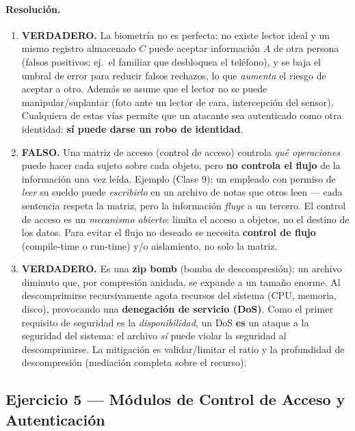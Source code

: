 \paragraph{Resolución.}
\begin{enumerate}[label=(\arabic*),leftmargin=2.2em,itemsep=4pt]
  \item \textbf{VERDADERO.} La biometría no es perfecta: no existe lector ideal y un mismo
        registro almacenado $C$ puede aceptar información $A$ de otra persona (falsos positivos;
        ej.\ el familiar que desbloquea el teléfono), y se baja el umbral de error para reducir
        falsos rechazos, lo que \emph{aumenta} el riesgo de aceptar a otro. Además se asume que el
        lector no se puede manipular/suplantar (foto ante un lector de cara, intercepción del
        sensor). Cualquiera de estas vías permite que un atacante sea autenticado como otra
        identidad: \textbf{sí puede darse un robo de identidad}.
  \item \textbf{FALSO.} Una matriz de acceso (control de acceso) controla \emph{qué operaciones}
        puede hacer cada sujeto sobre cada objeto, pero \textbf{no controla el flujo} de la
        información una vez leída. Ejemplo (Clase 9): un empleado con permiso de \emph{leer} su
        sueldo puede \emph{escribirlo} en un archivo de notas que otros leen --- cada sentencia
        respeta la matriz, pero la información \emph{fluye} a un tercero. El control de acceso es
        un \emph{mecanismo abierto}: limita el acceso a objetos, no el destino de los datos. Para
        evitar el flujo no deseado se necesita \textbf{control de flujo} (compile-time o run-time)
        y/o aislamiento, no solo la matriz.
  \item \textbf{VERDADERO.} Es una \textbf{zip bomb} (bomba de descompresión): un archivo
        diminuto que, por compresión anidada, se expande a un tamaño enorme. Al descomprimirse
        recursivamente agota recursos del sistema (CPU, memoria, disco), provocando una
        \textbf{denegación de servicio (DoS)}. Como el primer requisito de seguridad es la
        \emph{disponibilidad}, un DoS \textbf{es} un ataque a la seguridad del sistema: el archivo
        \emph{sí} puede violar la seguridad al descomprimirse. La mitigación es validar/limitar el
        ratio y la profundidad de descompresión (mediación completa sobre el recurso).
\end{enumerate}

\subsection{Ejercicio 5 — Módulos de Control de Acceso y Autenticación}

